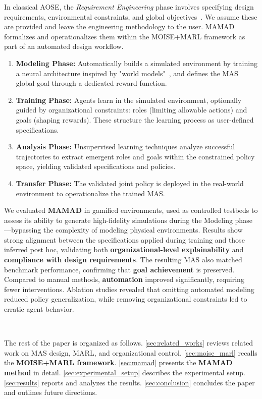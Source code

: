 \documentclass[pdflatex,sn-mathphys-num]{sn-jnl}%
\theoremstyle{thmstyleone}%
\theoremstyle{thmstyletwo}%
\theoremstyle{thmstylethree}%
\begin{document}
In classical AOSE, the \textit{Requirement Engineering} phase involves specifying design requirements, environmental constraints, and global objectives~\cite{Pavon2003, Bernon2005}. We assume these are provided and leave the engineering methodology to the user. MAMAD formalizes and operationalizes them within the MOISE+MARL framework as part of an automated design workflow.

\begin{enumerate}
    \item \textbf{Modeling Phase:} Automatically builds a simulated environment by training a neural architecture inspired by "world models"~\cite{Ha2018}, and defines the MAS global goal through a dedicated reward function.
    \item \textbf{Training Phase:} Agents learn in the simulated environment, optionally guided by organizational constraints: roles (limiting allowable actions) and goals (shaping rewards). These structure the learning process as user-defined specifications.
    \item \textbf{Analysis Phase:} Unsupervised learning techniques analyze successful trajectories to extract emergent roles and goals within the constrained policy space, yielding validated specifications and policies.
    \item \textbf{Transfer Phase:} The validated joint policy is deployed in the real-world environment to operationalize the trained MAS.
\end{enumerate}

We evaluated \textbf{MAMAD} in gamified environments, used as controlled testbeds to assess its ability to generate high-fidelity simulations during the Modeling phase—bypassing the complexity of modeling physical environments. Results show strong alignment between the specifications applied during training and those inferred post hoc, validating both \textbf{organizational-level explainability} and \textbf{compliance with design requirements}. The resulting MAS also matched benchmark performance, confirming that \textbf{goal achievement} is preserved. Compared to manual methods, \textbf{automation} improved significantly, requiring fewer interventions. Ablation studies revealed that omitting automated modeling reduced policy generalization, while removing organizational constraints led to erratic agent behavior.

\

The rest of the paper is organized as follows. \autoref{sec:related_works} reviews related work on MAS design, MARL, and organizational control. \autoref{sec:moise_marl} recalls the \textbf{MOISE+MARL framework}. \autoref{sec:mamad} presents the \textbf{MAMAD method} in detail. \autoref{sec:experimental_setup} describes the experimental setup. \autoref{sec:results} reports and analyzes the results. \autoref{sec:conclusion} concludes the paper and outlines future directions.
\end{document}
